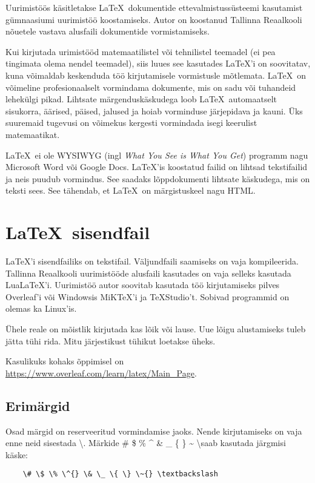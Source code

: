 \documentclass{trkut}%
\begin{document}
\maketitle%
\tableofcontents%


Uurimistöös käsitletakse \LaTeX \ dokumentide ettevalmistussüsteemi kasutamist gümnaasiumi uurimistöö koostamiseks. Autor on koostanud Tallinna Reaalkooli nõuetele vastava alusfaili dokumentide vormistamiseks.

Kui kirjutada urimistööd matemaatilistel või tehnilistel teemadel (ei pea tingimata olema nendel teemadel), siis luues see kasutades \LaTeX'i on soovitatav, kuna võimaldab keskenduda töö kirjutamisele vormistusle mõtlemata. \LaTeX \ on võimeline profesionaalselt vormindama dokumente, mis on sadu või tuhandeid lehekülgi pikad. Lihtsate märgenduskäskudega loob \LaTeX \ automaatselt sisukorra, äärised, päised, jalused ja hoiab vorminduse järjepidava ja kauni. Üks suuremaid tugevusi on võimekus kergesti vormindada isegi keerulist matemaatikat.

\LaTeX \ ei ole \textsc{WYSIWYG} (ingl \textit{What You See is What You Get}) programm nagu Microsoft Word või Google Docs. \LaTeX'is koostatud failid on lihtsad tekstifailid ja neis puudub vormindus. See saadaks lõppdokumenti lihtsate käskudega, mis on teksti sees. See tähendab, et \LaTeX \ on märgistuskeel nagu HTML.

\chapter{\LaTeX \ sisendfail}
\LaTeX'i sisendfailiks on tekstifail. Väljundfaili saamiseks on vaja kompileerida. Tallinna Reaalkooli uurimistööde alusfaili kasutades on vaja selleks kasutada LuaLaTeX'i. Uurimistöö autor soovitab kasutada töö kirjutamiseks pilves Overleaf'i või Windowsis MiKTeX'i ja TeXStudio't. Sobivad programmid on olemas ka Linux'is.

Ühele reale on mõistlik kirjutada kas lõik või lause. Uue lõigu alustamiseks tuleb jätta tühi rida. Mitu järjestikust tühikut loetakse üheks.

Kasulikuks kohaks õppimisel on \url{https://www.overleaf.com/learn/latex/Main_Page}.

\section{Erimärgid}
Osad märgid on reserveeritud vormindamise jaoks. Nende kirjutamiseks on vaja enne neid sisestada \textbackslash. Märkide \# \$ \% \^{} \& \_ \{ \} \~{} \textbackslash saab kasutada järgmisi käske:
\begin{verbatim}
    \# \$ \% \^{} \& \_ \{ \} \~{} \textbackslash
\end{verbatim}
\end{document}
